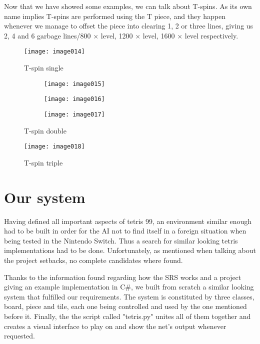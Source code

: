 Now that we have showed some examples, we can talk about T-spins. As its own name implies T-spins are performed using the T piece, and they happen whenever we manage to offset the piece into clearing 1, 2 or three lines, giving us 2, 4 and 6 garbage lines/800 × level, 1200 × level, 1600 × level respectively.

\begin{figure}[h]
\centering
\texttt{[image: image014]}
\caption{\label{fig:tspin1}T-spin single}
\end{figure}

\begin{figure}
\centering
\begin{subfigure}{.33\textwidth}
  \centering
  \texttt{[image: image015]}
\end{subfigure}%
\begin{subfigure}{.33\textwidth}
  \centering
  \texttt{[image: image016]}
\end{subfigure}%
\begin{subfigure}{.33\textwidth}
  \centering
  \texttt{[image: image017]}
\end{subfigure}
\caption{\label{fig:tspin2}T-spin double}
\end{figure}

\begin{figure}[h]
\centering
\texttt{[image: image018]}
\caption{\label{fig:tspin3}T-spin triple}
\end{figure}


\section{Our system}
Having defined all important aspects of tetris 99, an environment similar enough had to be built in order for the \ac{AI} not to find itself in a foreign situation when being tested in the Nintendo Switch. Thus a search for similar looking tetris implementations had to be done. Unfortunately, as mentioned when talking about the project setbacks, no complete candidates where found.

Thanks to the information found regarding how the \ac{SRS} works and a project giving an example implementation in C\#, we built from scratch a similar looking system that fulfilled our requirements. The system is constituted by three classes, board, piece and tile, each one being controlled and used by the one mentioned before it. Finally, the the script called "tetris.py" unites all of them together and creates a visual interface to play on and show the net's output whenever requested.

